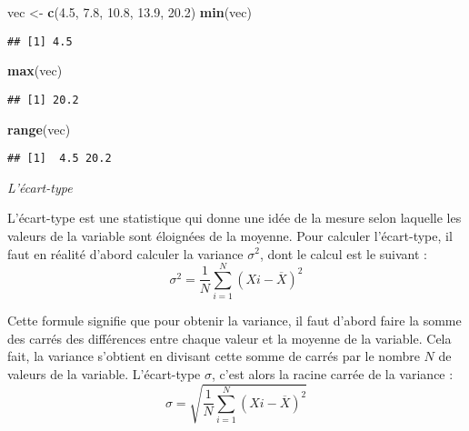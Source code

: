 \documentclass[
  french,
]{book}
\newenvironment{Shaded}{\begin{snugshade}}{\end{snugshade}}
\newcommand{\FloatTok}[1]{\textcolor[rgb]{0.00,0.00,0.81}{#1}}
\newcommand{\KeywordTok}[1]{\textcolor[rgb]{0.13,0.29,0.53}{\textbf{#1}}}
\newcommand{\NormalTok}[1]{#1}
\newcommand{\StringTok}[1]{\textcolor[rgb]{0.31,0.60,0.02}{#1}}
\begin{document}
\begin{Shaded}
\begin{Highlighting}[]
\NormalTok{vec <-}\StringTok{ }\KeywordTok{c}\NormalTok{(}\FloatTok{4.5}\NormalTok{, }\FloatTok{7.8}\NormalTok{, }\FloatTok{10.8}\NormalTok{, }\FloatTok{13.9}\NormalTok{, }\FloatTok{20.2}\NormalTok{)}
\KeywordTok{min}\NormalTok{(vec)}
\end{Highlighting}
\end{Shaded}

\begin{verbatim}
## [1] 4.5
\end{verbatim}

\begin{Shaded}
\begin{Highlighting}[]
\KeywordTok{max}\NormalTok{(vec)}
\end{Highlighting}
\end{Shaded}

\begin{verbatim}
## [1] 20.2
\end{verbatim}

\begin{Shaded}
\begin{Highlighting}[]
\KeywordTok{range}\NormalTok{(vec)}
\end{Highlighting}
\end{Shaded}

\begin{verbatim}
## [1]  4.5 20.2
\end{verbatim}

\emph{L'écart-type}

L'écart-type est une statistique qui donne une idée de la mesure selon laquelle les valeurs de la variable sont éloignées de la moyenne. Pour calculer l'écart-type, il faut en réalité d'abord calculer la variance \(\sigma^2\), dont le calcul est le suivant :
\[\sigma^2 = \frac{1}{N}\sum_{i=1}^{N} (X{i} - \overline{X})^2\]

Cette formule signifie que pour obtenir la variance, il faut d'abord faire la somme des carrés des différences entre chaque valeur et la moyenne de la variable. Cela fait, la variance s'obtient en divisant cette somme de carrés par le nombre \(N\) de valeurs de la variable. L'écart-type \(\sigma\), c'est alors la racine carrée de la variance :
\[\sigma = \sqrt{\frac{1}{N}\sum_{i=1}^{N} (X{i} - \overline{X})^2}\]
\end{document}
